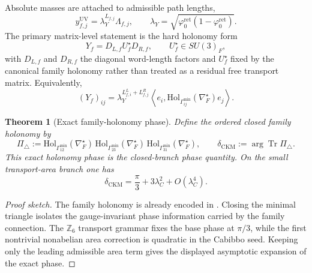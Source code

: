 \documentclass[11pt,a4paper]{article}
\newtheorem{theorem}{Theorem}[section]
\theoremstyle{definition}
\theoremstyle{remark}
\DeclareMathOperator{\tr}{Tr}
\newcommand{\phiz}{\varphi_0^{\mathrm{ret}}}
\newcommand{\lambdaY}{\lambda_Y}
\begin{document}
Absolute masses are attached to admissible path lengths,
\begin{equation}
\label{eq:path-length-yukawa}
y_{f,j}^{\mathrm{UV}}=\lambdaY^{L_{f,j}}\Lambda_{f,j},
\qquad
\lambdaY=\sqrt{\phiz(1-\phiz)}.
\end{equation}
The primary matrix-level statement is the hard holonomy form
\begin{equation}
\label{eq:yukawa-matrix-factorization}
Y_f=D_{L,f}U_f^\star D_{R,f},
\qquad
U_f^\star\in SU(3)_F,
\end{equation}
with $D_{L,f}$ and $D_{R,f}$ the diagonal word-length factors and $U_f^\star$ fixed by the
canonical family holonomy rather than treated as a residual free transport matrix. Equivalently,
\begin{equation}
\label{eq:yukawa-holonomy-matrix}
(Y_f)_{ij}
=
\lambdaY^{L^L_{f,i}+L^R_{f,j}}
\left\langle e_i,\mathrm{Hol}_{\Gamma_{ij}^{\min}}(\nabla_F^\star)e_j\right\rangle.
\end{equation}
\begin{theorem}[Exact family-holonomy phase]
\label{prop:holonomy-triangle-phase}
\label{prop:exact-family-holonomy-phase}
Define the ordered closed family holonomy by
\[
\Pi_\triangle
:=
\mathrm{Hol}_{\Gamma_{12}^{\min}}(\nabla_F^\star)\,
\mathrm{Hol}_{\Gamma_{23}^{\min}}(\nabla_F^\star)\,
\mathrm{Hol}_{\Gamma_{31}^{\min}}(\nabla_F^\star),
\qquad
\delta_{\mathrm{CKM}}
:=
\arg\tr\Pi_\triangle.
\]
This exact holonomy phase is the closed-branch phase quantity. On the
small transport-area branch one has
\begin{equation}
\label{eq:ckm-holonomy-phase}
\delta_{\mathrm{CKM}}
=
\frac{\pi}{3}+3\lambda_C^2+O(\lambda_C^4).
\end{equation}
\end{theorem}

\begin{proof}[Proof sketch]
The family holonomy is already encoded in . Closing the
minimal triangle isolates the gauge-invariant phase information carried by the family
connection. The $\mathbb Z_6$ transport grammar fixes the base phase at $\pi/3$, while the
first nontrivial nonabelian area correction is quadratic in the Cabibbo seed. Keeping only the
leading admissible area term gives the displayed asymptotic expansion of the exact phase.
\end{proof}
\end{document}
